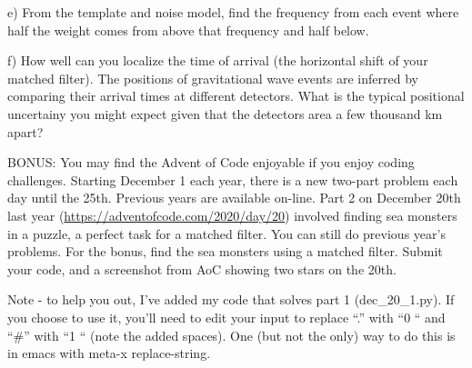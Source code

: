 \documentclass[11pt]{article}
\begin{document}
e) From the template and noise model, find the frequency from each
event where half the weight comes from above that frequency and half
below.  

f) How well can you localize the time of arrival (the horizontal shift
of your matched filter).  The positions of gravitational wave events
are inferred by comparing their arrival times at different detectors.
What is the typical positional uncertainy you might expect given that
the detectors area a few thousand km apart? 

\vskip 0.05in
BONUS: You may find the Advent of Code enjoyable if you enjoy coding
challenges.  Starting December 1 each year, there is a new two-part problem
each day until the 25th.  Previous years are available on-line.  Part
2 on December 20th last year ({\url{https://adventofcode.com/2020/day/20}})
involved finding sea monsters in a puzzle, a perfect task for a
matched filter.  You can still do previous year's problems.  For the
bonus, find the sea monsters using a matched filter.  Submit your
code, and a screenshot from AoC showing two stars on the 20th.  

Note - to help you out, I've added my code that solves part 1
(dec\_20\_1.py).  If you choose to use it, you'll need to edit your
input to replace ``.''  with ``0 `` and ``\#'' with ``1 `` (note the
added spaces).  One (but not the only) way to do this is in emacs with
meta-x replace-string.  
\end{document}

